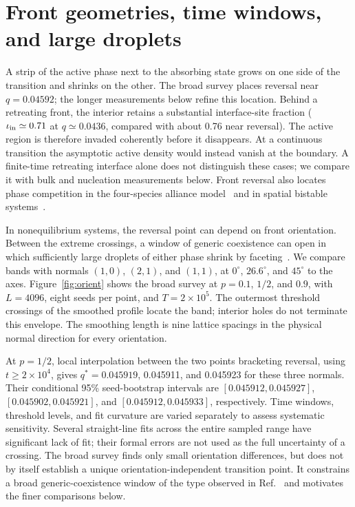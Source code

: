 \section{Front geometries, time windows, and large droplets}
\label{sec:sfronts}

A strip of the active phase next to the absorbing state grows on one side of
the transition and shrinks on the other. The broad survey places reversal
near $q=0.04592$; the longer measurements below refine this location.
Behind a retreating front, the interior retains a substantial interface-site
fraction ($\iota_{\rm in}\simeq0.71$ at $q\simeq0.0436$, compared with about
0.76 near reversal). The active region is therefore invaded coherently before
it disappears. At a continuous transition the asymptotic active density would
instead vanish at the boundary. A finite-time retreating interface alone
does not distinguish these cases; we compare it with bulk and nucleation
measurements below. Front reversal also locates phase competition in the
four-species alliance model~\cite{szabo2004} and in spatial bistable
systems~\cite{durrett1994,durrett2009}.

In nonequilibrium systems, the reversal point can depend on front orientation.
Between the extreme crossings, a window of generic coexistence can open in
which sufficiently large droplets of either phase shrink by
faceting~\cite{toom1980,bennett1985,wang2015}. We compare bands with normals
$(1,0)$, $(2,1)$, and $(1,1)$, at $0^\circ$, $26.6^\circ$, and $45^\circ$
to the axes. Figure~\ref{fig:orient} shows the broad survey at $p=0.1$, $1/2$,
and $0.9$, with $L=4096$, eight seeds per point, and $T=2\times10^5$.
The outermost threshold crossings of the smoothed profile locate the band;
interior holes do not terminate this envelope. The smoothing length is nine
lattice spacings in the physical normal direction for every orientation.

At $p=1/2$, local interpolation between the two points bracketing reversal,
using $t\ge2\times10^4$, gives $q^*=0.045919$, 0.045911, and 0.045923 for
these three normals. Their conditional 95\% seed-bootstrap intervals are
$[0.045912,0.045927]$, $[0.045902,0.045921]$, and
$[0.045912,0.045933]$, respectively. Time windows, threshold levels, and fit
curvature are varied separately to assess systematic sensitivity. Several
straight-line fits across the entire sampled range have significant lack of
fit; their formal errors are not used as the full uncertainty of a crossing.
The broad survey finds only small orientation differences, but does not by
itself establish a unique orientation-independent transition point. It
constrains a broad generic-coexistence window of the type observed in
Ref.~\cite{wang2015} and motivates the finer comparisons below.

